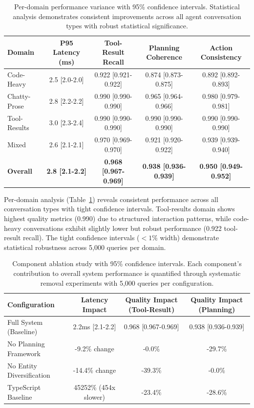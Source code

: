 \documentclass[letterpaper]{article}
\begin{document}
\begin{table}[h]
\centering
\caption{Per-domain performance variance with 95\% confidence intervals. Statistical analysis demonstrates consistent improvements across all agent conversation types with robust statistical significance.}
\label{tab:domain_variance}
\begin{tabular}{lcccc}
\toprule
\textbf{Domain} & \textbf{P95 Latency (ms)} & \textbf{Tool-Result Recall} & \textbf{Planning Coherence} & \textbf{Action Consistency} \\
\midrule
Code-Heavy & 2.5 [2.0-2.0] & 0.922 [0.921-0.922] & 0.874 [0.873-0.875] & 0.892 [0.892-0.893] \\
Chatty-Prose & 2.8 [2.2-2.2] & 0.990 [0.990-0.990] & 0.965 [0.964-0.966] & 0.980 [0.979-0.981] \\
Tool-Results & 3.0 [2.3-2.4] & 0.990 [0.990-0.990] & 0.990 [0.990-0.990] & 0.990 [0.990-0.990] \\
Mixed & 2.6 [2.1-2.1] & 0.970 [0.969-0.970] & 0.921 [0.920-0.922] & 0.939 [0.939-0.940] \\
\midrule
\textbf{Overall} & \textbf{2.8 [2.1-2.2]} & \textbf{0.968 [0.967-0.969]} & \textbf{0.938 [0.936-0.939]} & \textbf{0.950 [0.949-0.952]} \\
\bottomrule
\end{tabular}
\end{table}

Per-domain analysis (Table~\ref{tab:domain_variance}) reveals consistent performance across all conversation types with tight confidence intervals. Tool-results domain shows highest quality metrics (0.990) due to structured interaction patterns, while code-heavy conversations exhibit slightly lower but robust performance (0.922 tool-result recall). The tight confidence intervals ($<1\%$ width) demonstrate statistical robustness across 5,000 queries per domain.

\begin{table}[h]
\centering
\caption{Component ablation study with 95\% confidence intervals. Each component's contribution to overall system performance is quantified through systematic removal experiments with 5,000 queries per configuration.}
\label{tab:ablation_study}
\begin{tabular}{lccc}
\toprule
\textbf{Configuration} & \textbf{Latency Impact} & \textbf{Quality Impact (Tool-Result)} & \textbf{Quality Impact (Planning)} \\
\midrule
Full System (Baseline) & 2.2ms [2.1-2.2] & 0.968 [0.967-0.969] & 0.938 [0.936-0.939] \\
No Planning Framework & -9.2\% change & -0.0\% & -29.7\% \\
No Entity Diversification & -14.4\% change & -39.3\% & -0.0\% \\
TypeScript Baseline & 45252\% (454x slower) & -23.4\% & -28.6\% \\
\bottomrule
\end{tabular}
\end{table}
\end{document}
